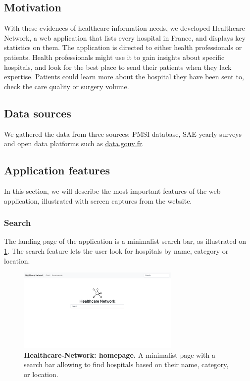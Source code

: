 \subsection{Motivation}

With these evidences of healthcare information needs, we developed Healthcare Network, a web application that lists every hospital in France, and displays key statistics on them. The application is directed to either health professionals or patients. Health professionals might use it to gain insights about specific hospitals, and look for the best place to send their patients when they lack expertise. Patients could learn more about the hospital they have been sent to, check the care quality or surgery volume.

\subsection{Data sources}

We gathered the data from three sources: PMSI database, SAE yearly surveys and open data platforms such as \href{https://data.gouv.fr}{data.gouv.fr}.

\subsection{Application features}

In this section, we will describe the most important features of the web application, illustrated with screen captures from the website.

\subsubsection{Search}

The landing page of the application is a minimalist search bar, as illustrated on \cref{fig:hn-home}. The search feature lets the user look for hospitals by name, category or location.

\begin{figure}[H]
    \includegraphics[width=0.7\textwidth]{images/healthcare-network/home.png}
    \centering
    \caption{
        \textbf{Healthcare-Network: homepage.} A minimalist page with a search bar allowing to find hospitals based on their name, category, or location.
    }
    \label{fig:hn-home}
\end{figure}

